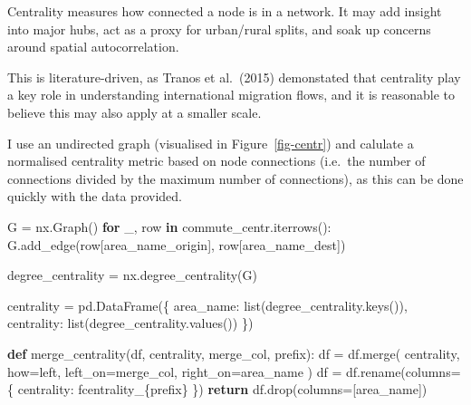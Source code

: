 \documentclass[
  number]{elsarticle}
\newenvironment{Shaded}{\begin{snugshade}}{\end{snugshade}}
\newcommand{\BuiltInTok}[1]{\textcolor[rgb]{0.00,0.23,0.31}{#1}}
\newcommand{\ControlFlowTok}[1]{\textcolor[rgb]{0.00,0.23,0.31}{\textbf{#1}}}
\newcommand{\KeywordTok}[1]{\textcolor[rgb]{0.00,0.23,0.31}{\textbf{#1}}}
\newcommand{\NormalTok}[1]{\textcolor[rgb]{0.00,0.23,0.31}{#1}}
\newcommand{\OperatorTok}[1]{\textcolor[rgb]{0.37,0.37,0.37}{#1}}
\newcommand{\SpecialCharTok}[1]{\textcolor[rgb]{0.37,0.37,0.37}{#1}}
\newcommand{\SpecialStringTok}[1]{\textcolor[rgb]{0.13,0.47,0.30}{#1}}
\newcommand{\StringTok}[1]{\textcolor[rgb]{0.13,0.47,0.30}{#1}}
\begin{document}
Centrality measures how connected a node is in a network. It may add
insight into major hubs, act as a proxy for urban/rural splits, and soak
up concerns around spatial autocorrelation.

This is literature-driven, as Tranos et al.~(2015) demonstated that
centrality play a key role in understanding international migration
flows, and it is reasonable to believe this may also apply at a smaller
scale.

I use an undirected graph (visualised in Figure~\ref{fig-centr}) and
calulate a normalised centrality metric based on node connections
(i.e.~the number of connections divided by the maximum number of
connections), as this can be done quickly with the data provided.

\begin{Shaded}
\begin{Highlighting}[]
\NormalTok{G }\OperatorTok{=}\NormalTok{ nx.Graph()}
\ControlFlowTok{for}\NormalTok{ \_, row }\KeywordTok{in}\NormalTok{ commute\_centr.iterrows():}
\NormalTok{    G.add\_edge(row[}\StringTok{\textquotesingle{}area\_name\_origin\textquotesingle{}}\NormalTok{], row[}\StringTok{\textquotesingle{}area\_name\_dest\textquotesingle{}}\NormalTok{])}
\end{Highlighting}
\end{Shaded}

\begin{Shaded}
\begin{Highlighting}[]
\NormalTok{degree\_centrality }\OperatorTok{=}\NormalTok{ nx.degree\_centrality(G)}

\NormalTok{centrality }\OperatorTok{=}\NormalTok{ pd.DataFrame(\{}
    \StringTok{\textquotesingle{}area\_name\textquotesingle{}}\NormalTok{: }\BuiltInTok{list}\NormalTok{(degree\_centrality.keys()),}
    \StringTok{\textquotesingle{}centrality\textquotesingle{}}\NormalTok{: }\BuiltInTok{list}\NormalTok{(degree\_centrality.values())}
\NormalTok{\})}
\end{Highlighting}
\end{Shaded}

\begin{Shaded}
\begin{Highlighting}[]
\KeywordTok{def}\NormalTok{ merge\_centrality(df, centrality, merge\_col, prefix):}
\NormalTok{    df }\OperatorTok{=}\NormalTok{ df.merge(}
\NormalTok{        centrality,}
\NormalTok{        how}\OperatorTok{=}\StringTok{\textquotesingle{}left\textquotesingle{}}\NormalTok{,}
\NormalTok{        left\_on}\OperatorTok{=}\NormalTok{merge\_col,}
\NormalTok{        right\_on}\OperatorTok{=}\StringTok{\textquotesingle{}area\_name\textquotesingle{}}
\NormalTok{    )}
\NormalTok{    df }\OperatorTok{=}\NormalTok{ df.rename(columns}\OperatorTok{=}\NormalTok{\{}
        \StringTok{\textquotesingle{}centrality\textquotesingle{}}\NormalTok{: }\SpecialStringTok{f\textquotesingle{}centrality\_}\SpecialCharTok{\{}\NormalTok{prefix}\SpecialCharTok{\}}\SpecialStringTok{\textquotesingle{}}
\NormalTok{    \})}
    \ControlFlowTok{return}\NormalTok{ df.drop(columns}\OperatorTok{=}\NormalTok{[}\StringTok{\textquotesingle{}area\_name\textquotesingle{}}\NormalTok{])}
\end{Highlighting}
\end{Shaded}
\end{document}
